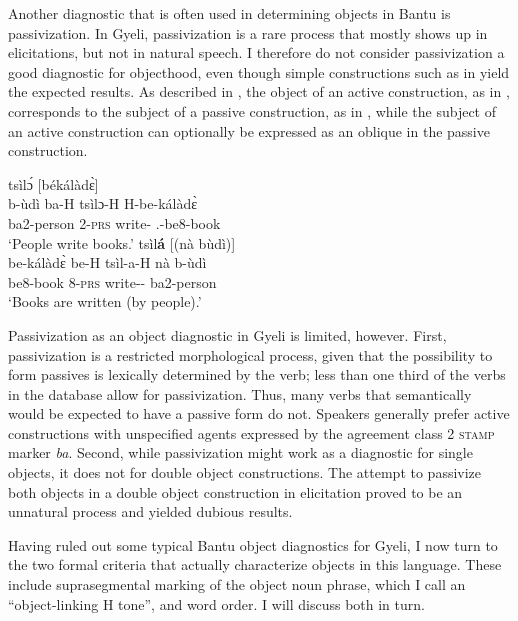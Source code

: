 Another diagnostic that is often used in determining objects in Bantu is passivization. In Gyeli, passivization is a rare process that mostly shows up in elicitations, but not in natural speech. I therefore do not consider passivization a good diagnostic for objecthood, even though simple constructions such as in  yield the expected results. As described in , the object of an active construction, as in , corresponds to the subject of a passive construction, as in , while the subject of an active construction can optionally be expressed as an oblique in the passive construction.

\ea\label{passdefa}
\ea  \label{passdef1a}
  \glll  [bùdì bá]\textsubscript{{\SBJ}} tsìlɔ́ [békálàdɛ̀]\textsubscript{{\OBJ}}\\
	{\db}b-ùdì ba-H tsìlɔ-H {\db}H-be-kálàdɛ̀ \\
             {\db}ba2-person 2-\textsc{prs} write-{\R} {\db}{\OBJ}.{\LINK}-be8-book\\
    \trans `People write books.'
\ex\label{passdef2a}
 \glll  [bèkálàdɛ̀ bé]\textsubscript{{\SBJ}} tsìl{\bfseries á} [(nà bùdì)]\textsubscript{{\OBL}} \\
	{\db}be-kálàdɛ̀ be-H tsìl-a-H {\db}{\db}nà b-ùdì \\
        {\db}be8-book 8-\textsc{prs} write-{\PASS}-{\R} {\db}{\db}{\COM} ba2-person\\
    \trans `Books are written (by people).'
\z
\z

Passivization as an object diagnostic in Gyeli is limited, however. First, passivization is a restricted morphological process, given that the possibility to form passives is lexically determined by the verb; less than one third of the verbs in the database allow for passivization. Thus, many verbs that semantically would be expected to have a passive form do not. Speakers generally prefer active constructions with unspecified agents expressed by the agreement class 2 \textsc{stamp} marker {\itshape ba}. Second, while passivization might work as a diagnostic for single objects, it does not for double object constructions. The attempt to passivize both objects in a double object construction in elicitation proved to be an unnatural process and yielded dubious results.

Having ruled out some typical Bantu object diagnostics for Gyeli, I now turn to the two formal criteria that actually characterize objects in this language. These include suprasegmental marking of the object noun phrase, which I call an ``object-linking H tone'', and word order. I will discuss both in turn.  



